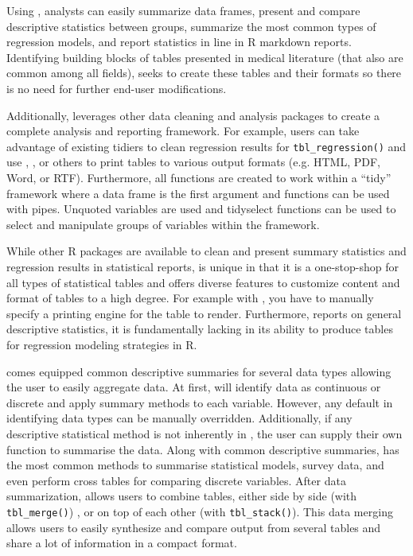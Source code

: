 Using , analysts can easily summarize data frames, present and compare descriptive statistics between groups, summarize the most common types of regression models, and report statistics in line in R markdown reports. 
Identifying building blocks of tables presented in medical literature (that also are common among all fields),  seeks to create these tables and their formats so there is no need for further end-user modifications.  

Additionally,  leverages other data cleaning and analysis packages to create a complete analysis and reporting framework.
For example, users can take advantage of existing  tidiers to clean regression results for \texttt{tbl\_regression()} and use , ,  or others to print  tables to various output formats (e.g. HTML, PDF, Word, or RTF).
Furthermore, all  functions are created to work within a “tidy” framework where a data frame is the first argument and functions can be used with pipes.
Unquoted variables are used and tidyselect functions can be used to select and manipulate groups of variables within the framework.

While other R packages are available to clean and present summary statistics and regression results in statistical reports,  is unique in that it is a one-stop-shop for all types of statistical tables and offers diverse features to customize content and format of tables to a high degree.
For example with , you have to manually specify a printing engine for the table to render.
Furthermore,  reports on general descriptive statistics, it is fundamentally lacking in its ability to produce tables for regression modeling strategies in R. 

 comes equipped common descriptive summaries for several data types allowing the user to easily aggregate data.
At first,  will identify data as continuous or discrete and apply summary methods to each variable. 
However, any default in identifying data types can be manually overridden. 
Additionally, if any descriptive statistical method is not inherently in , the user can supply their own function to summarise the data. 
Along with common descriptive summaries,  has the most common methods to summarise statistical models, survey data, and even perform cross tables for comparing discrete variables. 
After data summarization,  allows users to combine tables, either side by side (with \texttt{tbl\_merge()}) , or on top of each other (with \texttt{tbl\_stack()}). 
This data merging allows users to easily synthesize and compare output from several tables and share a lot of information in a compact format.   

